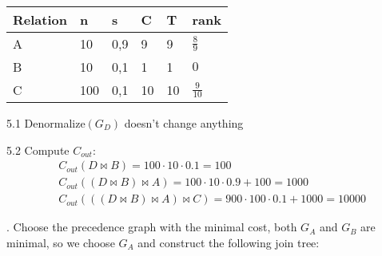 \documentclass{article}
\begin{document}
\begin{table}[!hbtp]
\begin{tabular}{|l|l|l|l|l|l|}
\hline
Relation & n   & s   & C  & T  & rank           \\ \hline
A        & 10  & 0,9 & 9  & 9  & $\frac{8}{9}$  \\ \hline
B        & 10  & 0,1 & 1  & 1  & $0$  \\ \hline
C        & 100 & 0,1 & 10 & 10 & $\frac{9}{10}$ \\ \hline
\end{tabular}
\end{table}

\vspace*{1cm}
5.1 Denormalize$(G_D)$ doesn't change anything

5.2 Compute $C_{out}$:
\begin{align}
& C_{out}(D \bowtie B) = 100 \cdot 10 \cdot 0.1 = 100 \nonumber \\
& C_{out}((D \bowtie B) \bowtie A) = 100 \cdot 10 \cdot 0.9 + 100 = 1000 \nonumber \\
& C_{out}(((D \bowtie B) \bowtie A) \bowtie C) = 900 \cdot 100 \cdot 0.1 + 1000 = 10000 \nonumber
\end{align}



. Choose the precedence graph with the minimal cost, both $G_A$ and $G_B$ are minimal, so we choose $G_A$ and construct the following join tree:

\end{document}
